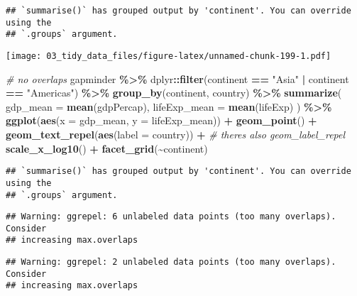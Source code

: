 \documentclass[
]{book}
\newenvironment{Shaded}{\begin{snugshade}}{\end{snugshade}}
\newcommand{\CommentTok}[1]{\textcolor[rgb]{0.56,0.35,0.01}{\textit{#1}}}
\newcommand{\DataTypeTok}[1]{\textcolor[rgb]{0.13,0.29,0.53}{#1}}
\newcommand{\KeywordTok}[1]{\textcolor[rgb]{0.13,0.29,0.53}{\textbf{#1}}}
\newcommand{\NormalTok}[1]{#1}
\newcommand{\OperatorTok}[1]{\textcolor[rgb]{0.81,0.36,0.00}{\textbf{#1}}}
\newcommand{\StringTok}[1]{\textcolor[rgb]{0.31,0.60,0.02}{#1}}
\begin{document}
\begin{verbatim}
## `summarise()` has grouped output by 'continent'. You can override using the
## `.groups` argument.
\end{verbatim}

\texttt{[image: 03\_tidy\_data\_files/figure-latex/unnamed-chunk-199-1.pdf]}

\begin{Shaded}
\begin{Highlighting}[]
\CommentTok{\# no overlaps}
\NormalTok{gapminder }\OperatorTok{\%\textgreater{}\%}
\StringTok{  }\NormalTok{dplyr}\OperatorTok{::}\KeywordTok{filter}\NormalTok{(continent }\OperatorTok{==}\StringTok{ "Asia"} \OperatorTok{|}\StringTok{ }\NormalTok{continent }\OperatorTok{==}\StringTok{ "Americas"}\NormalTok{) }\OperatorTok{\%\textgreater{}\%}
\StringTok{  }\KeywordTok{group\_by}\NormalTok{(continent, country) }\OperatorTok{\%\textgreater{}\%}
\StringTok{  }\KeywordTok{summarize}\NormalTok{(}
    \DataTypeTok{gdp\_mean =} \KeywordTok{mean}\NormalTok{(gdpPercap),}
    \DataTypeTok{lifeExp\_mean =} \KeywordTok{mean}\NormalTok{(lifeExp)}
\NormalTok{  ) }\OperatorTok{\%\textgreater{}\%}
\StringTok{  }\KeywordTok{ggplot}\NormalTok{(}\KeywordTok{aes}\NormalTok{(}\DataTypeTok{x =}\NormalTok{ gdp\_mean, }\DataTypeTok{y =}\NormalTok{ lifeExp\_mean)) }\OperatorTok{+}
\StringTok{  }\KeywordTok{geom\_point}\NormalTok{() }\OperatorTok{+}
\StringTok{  }\KeywordTok{geom\_text\_repel}\NormalTok{(}\KeywordTok{aes}\NormalTok{(}\DataTypeTok{label =}\NormalTok{ country)) }\OperatorTok{+}\StringTok{ }\CommentTok{\# there\textquotesingle{}s also geom\_label\_repel}
\StringTok{  }\KeywordTok{scale\_x\_log10}\NormalTok{() }\OperatorTok{+}
\StringTok{  }\KeywordTok{facet\_grid}\NormalTok{(}\OperatorTok{\textasciitilde{}}\NormalTok{continent)}
\end{Highlighting}
\end{Shaded}

\begin{verbatim}
## `summarise()` has grouped output by 'continent'. You can override using the
## `.groups` argument.
\end{verbatim}

\begin{verbatim}
## Warning: ggrepel: 6 unlabeled data points (too many overlaps). Consider
## increasing max.overlaps
\end{verbatim}

\begin{verbatim}
## Warning: ggrepel: 2 unlabeled data points (too many overlaps). Consider
## increasing max.overlaps
\end{verbatim}
\end{document}

